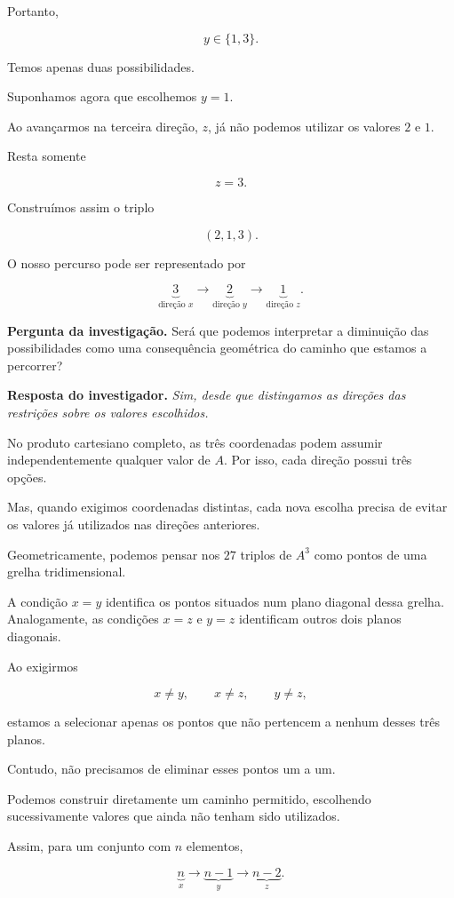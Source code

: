 \documentclass[11pt,a4paper,oneside]{book}
\newcommand{\Pergunta}[1]{\begin{perguntabox}\textbf{Pergunta da investigação.} #1\end{perguntabox}}
\newcommand{\Resposta}[1]{\textcolor{verdeescuro}{\textbf{Resposta do investigador.}} \emph{#1}\par}
\begin{document}
Portanto,

\[
y\in\{1,3\}.
\]

Temos apenas duas possibilidades.

Suponhamos agora que escolhemos $y=1$.

Ao avançarmos na terceira direção, $z$, já não
podemos utilizar os valores $2$ e $1$.

Resta somente

\[
z=3.
\]

Construímos assim o triplo

\[
(2,1,3).
\]

O nosso percurso pode ser representado por

\[
\underbrace{3}_{\text{direção }x}
\longrightarrow
\underbrace{2}_{\text{direção }y}
\longrightarrow
\underbrace{1}_{\text{direção }z}.
\]

\Pergunta{Será que podemos interpretar a diminuição
das possibilidades como uma consequência geométrica
do caminho que estamos a percorrer?}

\Resposta{Sim, desde que distingamos as direções
das restrições sobre os valores escolhidos.}

No produto cartesiano completo, as três coordenadas
podem assumir independentemente qualquer valor de
$A$. Por isso, cada direção possui três opções.

Mas, quando exigimos coordenadas distintas, cada
nova escolha precisa de evitar os valores já
utilizados nas direções anteriores.

Geometricamente, podemos pensar nos $27$ triplos
de $A^3$ como pontos de uma grelha tridimensional.

A condição $x=y$ identifica os pontos situados
num plano diagonal dessa grelha. Analogamente,
as condições $x=z$ e $y=z$ identificam outros
dois planos diagonais.

Ao exigirmos

\[
x\neq y,\qquad x\neq z,\qquad y\neq z,
\]

estamos a selecionar apenas os pontos que não
pertencem a nenhum desses três planos.

Contudo, não precisamos de eliminar esses pontos
um a um.

Podemos construir diretamente um caminho permitido,
escolhendo sucessivamente valores que ainda não
tenham sido utilizados.

Assim, para um conjunto com $n$ elementos,

\[
\underbrace{n}_{x}
\longrightarrow
\underbrace{n-1}_{y}
\longrightarrow
\underbrace{n-2}_{z}.
\]
\end{document}
